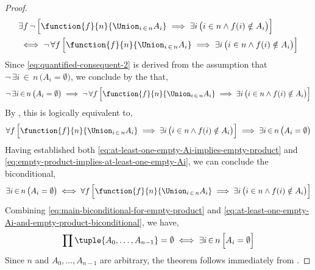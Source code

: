 \begin{proof}
\begin{align}
        &\exists f \, \lnot \, \Big[ \function{f}{n}{\Union_{i \,\in\, n} A_{i}} \implies \exists i \, \big( i \in n \land f(i) \notin A_{i} \big) \Big] \notag \\
        &\iff
        \lnot \, \forall f \, \Big[ \function{f}{n}{\Union_{i \,\in\, n} A_{i}} \implies \exists i \, \big( i \in n \land f(i) \notin A_{i} \big) \Big]
        \label{eq:quantified-consequent-2}
    \end{align}
    Since \eqref{eq:quantified-consequent-2} is derived from the assumption that \( \lnot \, \exists i\,{\in}\,n \, \big( A_{i} = \emptyset \big) \), we conclude
    by the  that,
    \begin{equation*}
        \lnot \, \exists i\,{\in}\,n \, \big( A_{i} = \emptyset \big)
        \implies \lnot \, \forall f \, \Big[ \function{f}{n}{\Union_{i \,\in\, n} A_{i}} \implies \exists i \, \big( i \in n \land f(i) \notin A_{i} \big) \Big]
    \end{equation*}
    By , this is logically equivalent to,
    \begin{equation}
        \label{eq:empty-product-implies-at-least-one-empty-Ai}
        \forall f \, \Big[ \function{f}{n}{\Union_{i \,\in\, n} A_{i}} \implies \exists i \, \big( i \in n \land f(i) \notin A_{i} \big) \Big]
        \implies \exists i\,{\in}\,n \, \big( A_{i} = \emptyset \big)
    \end{equation}
    Having established both \eqref{eq:at-least-one-empty-Ai-implies-empty-product} and \eqref{eq:empty-product-implies-at-least-one-empty-Ai},
    we can conclude the biconditional,
    \begin{equation}
        \label{eq:at-least-one-empty-Ai-and-empty-product-biconditional}
        \exists i\,{\in}\,n \, \big( A_{i} = \emptyset \big)
        \iff
        \forall f \, \Big[ \function{f}{n}{\Union_{i \,\in\, n} A_{i}} \implies \exists i \, \big( i \in n \land f(i) \notin A_{i} \big) \Big]
    \end{equation}
    Combining \eqref{eq:main-biconditional-for-empty-product} and \eqref{eq:at-least-one-empty-Ai-and-empty-product-biconditional}, we have,
    \begin{equation*}
        \prod \tuple{A_{0}, \dots, A_{n-1}} = \emptyset
        \iff
        \exists i\,{\in}\,n \, \Big[ A_{i} = \emptyset \Big]
    \end{equation*}
    Since \( n \) and \( A_{0},\dots,A_{n-1} \) are arbitrary, the theorem follows immediately from .
\end{proof}

